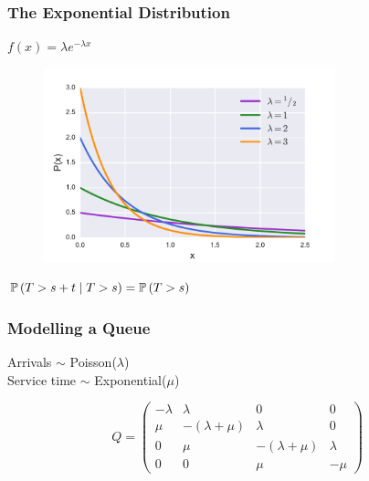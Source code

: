 \documentclass{beamer}
\begin{document}
\begin{frame}
\frametitle{The Exponential Distribution}
\begin{center}
$f(x) = \lambda e^{-\lambda x}$
\begin{figure}
\includegraphics[width=0.75\textwidth]{expon_dist}
\end{figure}
$\mathbb{P}\left(T > s + t \nonscript\; | \nonscript\; T > s\right) = \mathbb{P}\left(T > s\right)$
\end{center}
\end{frame}


\begin{frame}
\frametitle{Modelling a Queue}
\begin{figure}
  
\end{figure}

\begin{tcolorbox}[colback=orange!25!yellow!25,colframe=orange!50!yellow]
\begin{center}
Arrivals $\sim$ Poisson($\lambda$)\\
Service time $\sim$ Exponential($\mu$)
\end{center}
\end{tcolorbox}
\end{frame}




\begin{frame}
\begin{figure}
  
\end{figure}
\end{frame}


\begin{frame}
\begin{equation*}
  Q = \left(\begin{array}{cccc}
  -\lambda & \lambda & 0 & 0 \\
  \mu & -(\lambda+\mu) & \lambda & 0 \\
  0 & \mu & -(\lambda+\mu) & \lambda \\
  0 & 0 & \mu & -\mu\end{array}\right)
\end{equation*}
\end{frame}
\end{document}
